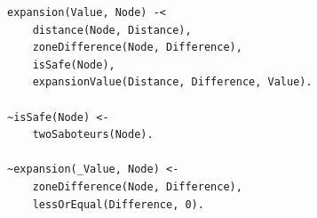 \documentclass[pdf,xcolor=svgnames]{beamer}
\begin{document}

\begin{frame}[fragile]

\begin{verbatim}
expansion(Value, Node) -<
    distance(Node, Distance),
    zoneDifference(Node, Difference),
    isSafe(Node),
    expansionValue(Distance, Difference, Value).
    
~isSafe(Node) <-
    twoSaboteurs(Node).
    
~expansion(_Value, Node) <-
    zoneDifference(Node, Difference),
    lessOrEqual(Difference, 0).
        
\end{verbatim}
\end{frame}
\end{document}
